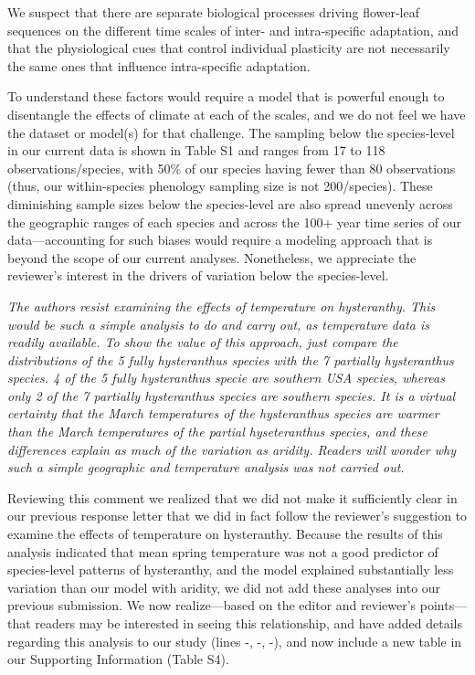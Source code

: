 \documentclass{article}[12pt]
\begin{document}
We suspect that there are separate biological processes driving flower-leaf sequences on the different time scales of inter- and intra-specific adaptation, and that the physiological cues that control individual plasticity are not necessarily the same ones that influence intra-specific adaptation. 

To understand these factors would require a model that is powerful enough to disentangle the effects of climate at each of the scales, and we do not feel we have the dataset or model(s) for that challenge. The sampling below the species-level in our current data is shown in Table S1 and ranges from 17 to 118 observations/species, with 50\% of our species having fewer than 80 observations  (thus, our within-species phenology sampling size is not 200/species). These diminishing sample sizes below the species-level are also spread unevenly across the geographic ranges of each species and across the 100+ year time series of our data---accounting for such biases would require a modeling approach that is beyond the scope of our current analyses. Nonetheless, we appreciate the reviewer's interest in the drivers of variation below the species-level.%

\emph{The authors resist examining the effects of temperature on hysteranthy. This would be such a simple analysis to do and carry out, as temperature data is readily available. To show the value of this approach, just compare the distributions of the 5 fully hysteranthus species with the 7 partially hysteranthus species. 4 of the 5 fully hysteranthus specie are southern USA species, whereas only 2 of the 7 partially hysteranthus species are southern species. It is a virtual certainty that the March temperatures of the hysteranthus species are warmer than the March temperatures of the partial hyseteranthus species, and these differences explain as much of the variation as aridity. Readers will wonder why such a simple geographic and temperature analysis was not carried out.}

Reviewing this comment we realized that we did not make it sufficiently clear in our previous response letter that we did in fact follow the reviewer's suggestion to examine the effects of temperature on hysteranthy. Because the results of this analysis indicated that mean spring temperature was not a good predictor of species-level patterns of hysteranthy, and the model explained substantially less variation than our model with aridity, we did not add these analyses into our previous submission. We now realize---based on the editor and reviewer's points---that readers may be interested in seeing this relationship, and have added details regarding this analysis to our study (lines -, -, -), and now include a new table in our Supporting Information (Table S4).
\end{document}
